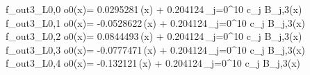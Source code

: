 f_{out3_L0,0	o0}(x)= 0.0295281\,\phi(x) + 0.204124\,\sum_{j=0}^{10} c_j B_{j,3}(x)
f_{out3_L0,1	o0}(x)= -0.0528622\,\phi(x) + 0.204124\,\sum_{j=0}^{10} c_j B_{j,3}(x)
f_{out3_L0,2	o0}(x)= 0.0844493\,\phi(x) + 0.204124\,\sum_{j=0}^{10} c_j B_{j,3}(x)
f_{out3_L0,3	o0}(x)= -0.0777471\,\phi(x) + 0.204124\,\sum_{j=0}^{10} c_j B_{j,3}(x)
f_{out3_L0,4	o0}(x)= -0.132121\,\phi(x) + 0.204124\,\sum_{j=0}^{10} c_j B_{j,3}(x)
